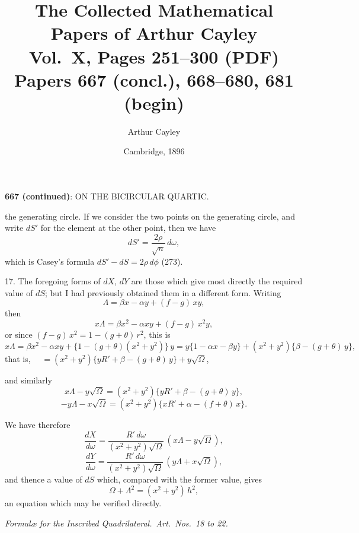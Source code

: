 \documentclass[11pt,a4paper]{article}
\title{The Collected Mathematical Papers of Arthur Cayley\\[6pt]
\large Vol.~X, Pages 251--300 (PDF) \\[4pt]
\normalsize Papers 667 (concl.), 668--680, 681 (begin)}
\author{Arthur Cayley}
\date{Cambridge, 1896}
\begin{document}
\maketitle
\thispagestyle{fancy}

\setcounter{page}{251}



\begin{center}
\textbf{667 (continued)}: ON THE BICIRCULAR QUARTIC.
\end{center}

\medskip

\noindent the generating circle. If we consider the two points on the generating circle, and write $dS'$ for the element at the other point, then we have
\[
dS' = \frac{2\rho}{\sqrt{n}}\,d\omega,
\]
which is Casey's formula $dS' - dS = 2\rho\,d\phi$ (273).

\medskip

17. The foregoing forms of $dX$, $dY$ are those which give most directly the required value of $dS$; but I had previously obtained them in a different form. Writing
\[
\Lambda = \beta x - \alpha y + (f - g)\,xy,
\]
then
\[
x\Lambda = \beta x^{2} - \alpha xy + (f - g)\,x^{2}y,
\]
or since $(f - g)\,x^{2} = 1 - (g + \theta)\,r^{2}$, this is
\[
x\Lambda = \beta x^{2} - \alpha xy + \{1 - (g + \theta)(x^{2} + y^{2})\}\,y = y\{1 - \alpha x - \beta y\} + (x^{2} + y^{2})\{\beta - (g + \theta)\,y\},
\]
that is, $\quad = (x^{2} + y^{2})\{yR' + \beta - (g + \theta)\,y\} + y\sqrt{\Omega}$,

\medskip

\noindent and similarly
\[
x\Lambda - y\sqrt{\Omega} = (x^{2} + y^{2})\{yR' + \beta - (g + \theta)\,y\},
\]
\[
-y\Lambda - x\sqrt{\Omega} = (x^{2} + y^{2})\{xR' + \alpha - (f + \theta)\,x\}.
\]

We have therefore
\[
\frac{dX}{d\omega} = \frac{R'\,d\omega}{(x^{2} + y^{2})\sqrt{\Omega}}\,(x\Lambda - y\sqrt{\Omega}),
\]
\[
\frac{dY}{d\omega} = \frac{R'\,d\omega}{(x^{2} + y^{2})\sqrt{\Omega}}\,(y\Lambda + x\sqrt{\Omega}),
\]
and thence a value of $dS$ which, compared with the former value, gives
\[
\Omega + \Lambda^{2} = (x^{2} + y^{2})\,h^{2},
\]
an equation which may be verified directly.

\bigskip

\begin{center}
\emph{Formul\ae{} for the Inscribed Quadrilateral.\ Art.\ Nos.\ 18 to 22.}
\end{center}
\end{document}
